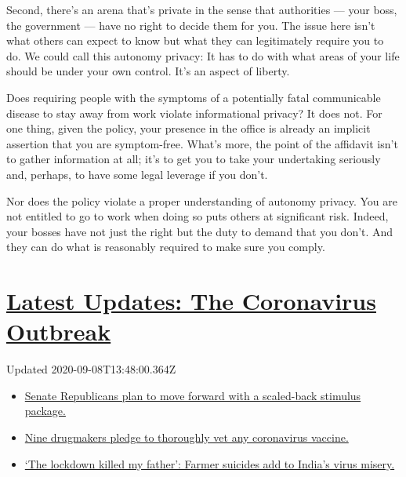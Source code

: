 Second, there's an arena that's private in the sense that authorities
--- your boss, the government --- have no right to decide them for you.
The issue here isn't what others can expect to know but what they can
legitimately require you to do. We could call this autonomy privacy: It
has to do with what areas of your life should be under your own control.
It's an aspect of liberty.

Does requiring people with the symptoms of a potentially fatal
communicable disease to stay away from work violate informational
privacy? It does not. For one thing, given the policy, your presence in
the office is already an implicit assertion that you are symptom-free.
What's more, the point of the affidavit isn't to gather information at
all; it's to get you to take your undertaking seriously and, perhaps, to
have some legal leverage if you don't.

Nor does the policy violate a proper understanding of autonomy privacy.
You are not entitled to go to work when doing so puts others at
significant risk. Indeed, your bosses have not just the right but the
duty to demand that you don't. And they can do what is reasonably
required to make sure you comply.

\hypertarget{latest-updates-the-coronavirus-outbreak}{%
\section{\texorpdfstring{\href{https://www.nytimes3xbfgragh.onion/2020/09/08/world/covid-19-coronavirus.html?action=click\&pgtype=Article\&state=default\&region=MAIN_CONTENT_1\&context=storylines_live_updates}{Latest
Updates: The Coronavirus
Outbreak}}{Latest Updates: The Coronavirus Outbreak}}\label{latest-updates-the-coronavirus-outbreak}}

Updated 2020-09-08T13:48:00.364Z

\begin{itemize}
\tightlist
\item
  \href{https://www.nytimes3xbfgragh.onion/2020/09/08/world/covid-19-coronavirus.html?action=click\&pgtype=Article\&state=default\&region=MAIN_CONTENT_1\&context=storylines_live_updates\#link-547feae1}{Senate
  Republicans plan to move forward with a scaled-back stimulus package.}
\item
  \href{https://www.nytimes3xbfgragh.onion/2020/09/08/world/covid-19-coronavirus.html?action=click\&pgtype=Article\&state=default\&region=MAIN_CONTENT_1\&context=storylines_live_updates\#link-679303d7}{Nine
  drugmakers pledge to thoroughly vet any coronavirus vaccine.}
\item
  \href{https://www.nytimes3xbfgragh.onion/2020/09/08/world/covid-19-coronavirus.html?action=click\&pgtype=Article\&state=default\&region=MAIN_CONTENT_1\&context=storylines_live_updates\#link-1c973131}{`The
  lockdown killed my father': Farmer suicides add to India's virus
  misery.}
\end{itemize}

